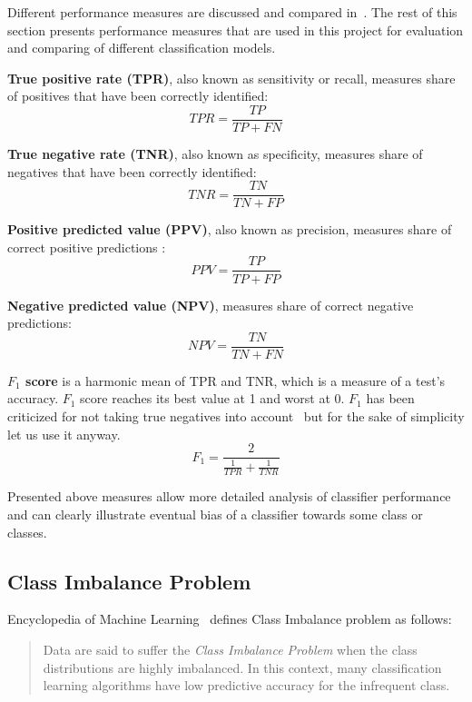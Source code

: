 \documentclass[a4paper, 11pt, table]{article}
\begin{document}
Different performance measures are discussed and compared in~\cite{powers07evaluation}. The rest of this section presents performance measures that are used in this project for evaluation and comparing of different classification models. 

\textbf{True positive rate (TPR)}, also known as sensitivity or recall, measures share of positives that have been correctly identified:
\begin{equation*}
TPR = \frac{TP}{TP + FN}
\end{equation*}

\textbf{True negative rate (TNR)}, also known as specificity, measures share of negatives that have been correctly identified:
\begin{equation*}
TNR = \frac{TN}{TN + FP}
\end{equation*}

\textbf{Positive predicted value (PPV)}, also known as precision, measures share of correct positive predictions :
\begin{equation*}
PPV = \frac{TP}{TP + FP}
\end{equation*}

\textbf{Negative predicted value (NPV)}, measures share of correct negative predictions:
\begin{equation*}
NPV = \frac{TN}{TN + FN}
\end{equation*}

\textbf{$F_1$ score} is a harmonic mean of TPR and TNR, which is a measure of a test's accuracy. $F_1$ score reaches its best value at 1 and worst at 0. $F_1$ has been criticized for not taking true negatives into account~\cite{powers07evaluation} but for the sake of simplicity let us use it anyway.   
\begin{equation*}
F_1 = \frac{2}{\frac{1}{TPR} + \frac{1}{TNR}}
\end{equation*}

Presented above measures allow more detailed analysis of classifier performance and can clearly illustrate eventual bias of a classifier towards some class or classes. 

\subsection{Class Imbalance Problem}
\label{sec:class_imbalance}
Encyclopedia of Machine Learning~\cite{Ling2010} defines Class Imbalance problem as follows:
\blockquote{Data are said to suffer the \textit{Class Imbalance Problem} when the class distributions are highly imbalanced. In this context, many classification learning algorithms have low predictive accuracy for the infrequent class.}
\end{document}
